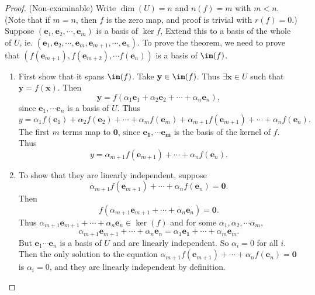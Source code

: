 \documentclass[a4paper]{article}
\begin{document}
\begin{proof}
  (Non-examinable) Write $\dim(U) = n$ and $n(f) = m$ with $m < n$. (Note that if $m = n$, then $f$ is the zero map, and proof is trivial with $r(f) = 0$.) Suppose $(\mathbf{e}_1, \mathbf{e}_2,\cdots, \mathbf{e}_m)$ is a basis of $\ker f$, Extend this to a basis of the whole of $U$, ie. $(\mathbf{e}_1, \mathbf{e}_2, \cdots, \mathbf{e}_m, \mathbf{e}_{m+1}, \cdots, \mathbf{e}_n)$. To prove the theorem, we need to prove that $(f(\mathbf{e}_{m+1}), f(\mathbf{e}_{m + 2}), \cdots f({\mathbf{e}_n}))$ is a basis of $\im (f)$.
  \begin{enumerate}
    \item First show that it spans $\im (f)$. Take $\mathbf{y}\in \im(f)$. Thus $\exists \mathbf{x}\in U$ such that $\mathbf{y} = f(\mathbf{x})$. Then
      \[
        \mathbf{y} = f(\alpha_1\mathbf{e}_1 + \alpha_2\mathbf{e}_2 + \cdots + \alpha_n \mathbf{e}_n),
      \]
      since $\mathbf{e}_1, \cdots \mathbf{e}_n$ is a basis of $U$. Thus
      \[
        y = \alpha_1f(\mathbf{e}_1) + \alpha_2f(\mathbf{e}_2) + \cdots + \alpha_m f(\mathbf{e}_m) + \alpha_{m + 1}f(\mathbf{e}_{m + 1}) + \cdots + \alpha_nf(\mathbf{e}_n).
      \]
      The first $m$ terms map to $\mathbf{0}$, since $\mathbf{e_1, \cdots e_m}$ is the basis of the kernel of $f$. Thus
      \[
        y = \alpha_{m + 1} f(\mathbf{e}_{m + 1}) + \cdots + \alpha_n f(\mathbf{e}_n).
      \]
    \item To show that they are linearly independent, suppose
      \[
        \alpha_{m + 1} f(\mathbf{e}_{m + 1}) + \cdots + \alpha_n f(\mathbf{e}_n) = \mathbf{0}.
      \]
      Then 
      \[
        f(\alpha_{m + 1}\mathbf{e}_{m + 1} + \cdots + \alpha_n\mathbf{e}_n) = \mathbf{0}.
      \]
      Thus $\alpha_{m + 1}\mathbf{e}_{m + 1} + \cdots + \alpha_n\mathbf{e}_n\in \ker (f)$ and for some $\alpha_1, \alpha_2, \cdots \alpha_m$, 
      \[
        \alpha_{m + 1}\mathbf{e}_{m + 1} + \cdots + \alpha_n\mathbf{e}_n = \alpha_1\mathbf{e_1} + \cdots + \alpha_m\mathbf{e}_m.
      \]
      But $\mathbf{e}_1\cdots \mathbf{e}_n$ is a basis of $U$ and are linearly independent. So $\alpha_i = 0$ for all $i$. Then the only solution to the equation $\alpha_{m + 1} f(\mathbf{e}_{m + 1}) + \cdots + \alpha_n f(\mathbf{e}_n) = \mathbf{0}$ is $\alpha_i = 0$, and they are linearly independent by definition.
  \end{enumerate}
\end{proof}
\end{document}
